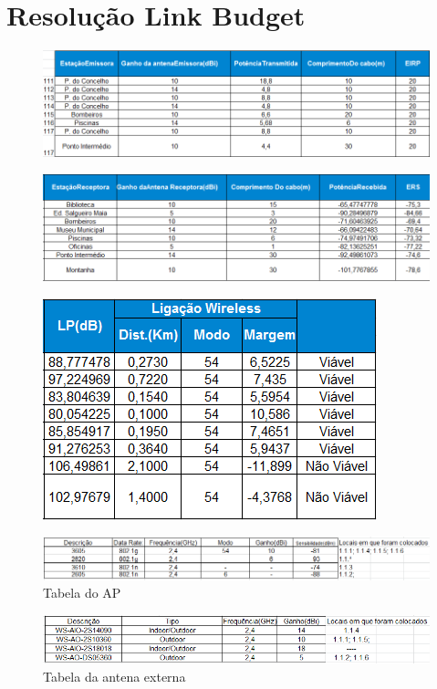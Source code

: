 \documentclass[a4paper,titlepage]{article}
\begin{document}
		\section{Resolução Link Budget}
		\begin{figure}[H]
											\centering
											\includegraphics[width=\linewidth]{TAB1.png}
		\end{figure}
		\begin{figure}[H]
											\centering
											\includegraphics[width=\linewidth]{TAB2.png}
		\end{figure}
		\begin{figure}[H]
											\centering
											\includegraphics[width=\linewidth]{TAB3.png}
		\end{figure}
		\begin{figure}[H]
											\centering
											\includegraphics[width=\linewidth]{TABAP.png}
											\caption{Tabela do AP}
		\end{figure}
		\begin{figure}[H]
											\centering
											\includegraphics[width=\linewidth]{TABANTEXT.png}
											\caption{Tabela da antena externa}
		\end{figure}
\end{document}
